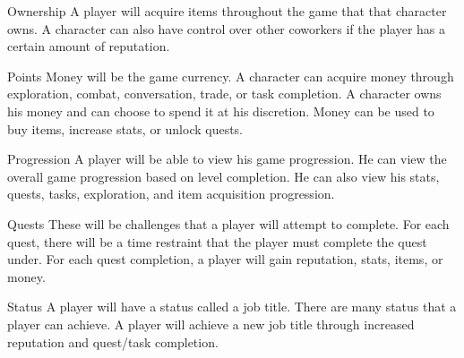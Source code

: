 \documentclass[12pt]{article}
\begin{document}
\begin{section}{Ownership}
A player will acquire items throughout the game that that character owns. A
character can also have control over other coworkers if the player has a certain
amount of reputation.
\end{section}

\begin{section}{Points}
Money will be the game currency. A character can acquire money through
exploration, combat, conversation, trade, or task completion. A character owns
his money and can choose to spend it at his discretion. Money can be used to buy
items, increase stats, or unlock quests.
\end{section}

\begin{section}{Progression}
A player will be able to view his game progression. He can view the overall game
progression based on level completion. He can also view his stats, quests,
tasks, exploration, and item acquisition progression.
\end{section}

\begin{section}{Quests}
These will be challenges that a player will attempt to complete. For each quest,
there will be a time restraint that the player must complete the quest under.
For each quest completion, a player will gain reputation, stats, items, or
money.
\end{section}

\begin{section}{Status}
A player will have a status called a job title. There are many status that a
player can achieve. A player will achieve a new job title through increased
reputation and quest/task completion.
\end{section}
\end{document}
